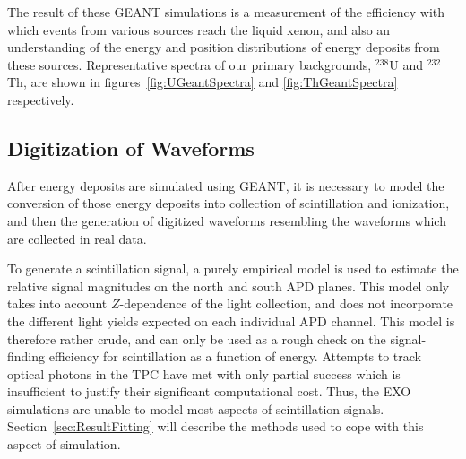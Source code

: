 The result of these GEANT simulations is a measurement of the efficiency with which events from various sources reach the liquid xenon, and also an understanding of the energy and position distributions of energy deposits from these sources.  Representative spectra of our primary backgrounds, $^{238}$U and $^{232}$Th, are shown in figures~\ref{fig:UGeantSpectra} and \ref{fig:ThGeantSpectra} respectively.

\subsection{Digitization of Waveforms}

After energy deposits are simulated using GEANT, it is necessary to model the conversion of those energy deposits into collection of scintillation and ionization, and then the generation of digitized waveforms resembling the waveforms which are collected in real data.

To generate a scintillation signal, a purely empirical model is used to estimate the relative signal magnitudes on the north and south APD planes.  This model only takes into account $Z$-dependence of the light collection, and does not incorporate the different light yields expected on each individual APD channel.  This model is therefore rather crude, and can only be used as a rough check on the signal-finding efficiency for scintillation as a function of energy.  Attempts to track optical photons in the TPC have met with only partial success which is insufficient to justify their significant computational cost.  Thus, the EXO simulations are unable to model most aspects of scintillation signals.  Section~\ref{sec:ResultFitting} will describe the methods used to cope with this aspect of simulation.

